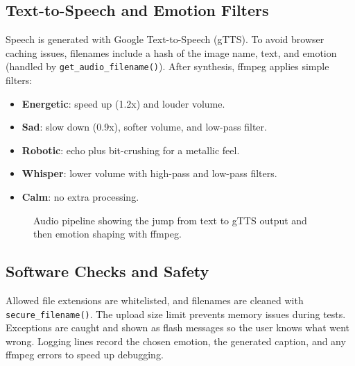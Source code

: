 \documentclass[11pt]{article}
\begin{document}
\subsection{Text-to-Speech and Emotion Filters}
Speech is generated with Google Text-to-Speech (gTTS). To avoid browser caching issues, filenames include a hash of the image name, text, and emotion (handled by \texttt{get\_audio\_filename()}). After synthesis, ffmpeg applies simple filters:
\begin{itemize}
    \item \textbf{Energetic}: speed up (1.2x) and louder volume.
    \item \textbf{Sad}: slow down (0.9x), softer volume, and low-pass filter.
    \item \textbf{Robotic}: echo plus bit-crushing for a metallic feel.
    \item \textbf{Whisper}: lower volume with high-pass and low-pass filters.
    \item \textbf{Calm}: no extra processing.
\end{itemize}

\begin{figure}[h]
    \centering
    \caption{Audio pipeline showing the jump from text to gTTS output and then emotion shaping with ffmpeg.}
    \label{fig:audio}
\end{figure}

\subsection{Software Checks and Safety}
Allowed file extensions are whitelisted, and filenames are cleaned with \texttt{secure\_filename()}. The upload size limit prevents memory issues during tests. Exceptions are caught and shown as flash messages so the user knows what went wrong. Logging lines record the chosen emotion, the generated caption, and any ffmpeg errors to speed up debugging.
\end{document}
